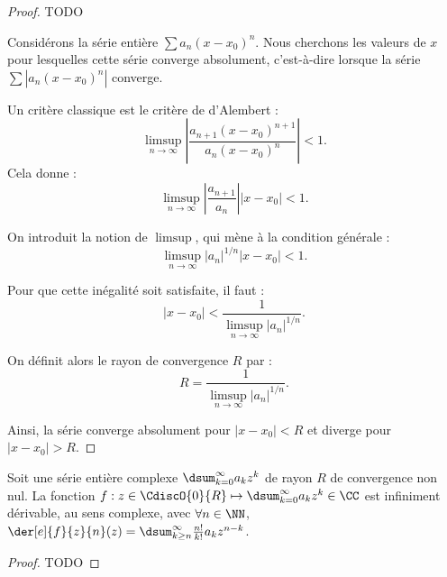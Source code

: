 \begin{proof}
	TODO
	
	
	
	Considérons la série entière \( \sum a_n (x - x_0)^n \). Nous cherchons les valeurs de \( x \) pour lesquelles cette série converge absolument, c'est-à-dire lorsque la série \( \sum |a_n (x - x_0)^n| \) converge.

Un critère classique est le critère de d'Alembert :
\begin{equation}
    \limsup_{n \to \infty} \left| \frac{a_{n+1} (x - x_0)^{n+1}}{a_n (x - x_0)^n} \right| < 1.
\end{equation}
Cela donne :
\begin{equation}
    \limsup_{n \to \infty} \left| \frac{a_{n+1}}{a_n} \right| |x - x_0| < 1.
\end{equation}

On introduit la notion de \( \limsup \), qui mène à la condition générale :
\begin{equation}
    \limsup_{n \to \infty} |a_n|^{1/n} |x - x_0| < 1.
\end{equation}

Pour que cette inégalité soit satisfaite, il faut :
\begin{equation}
    |x - x_0| < \frac{1}{\limsup_{n \to \infty} |a_n|^{1/n}}.
\end{equation}

On définit alors le rayon de convergence \( R \) par :
\begin{equation}
    R = \frac{1}{\limsup_{n \to \infty} |a_n|^{1/n}}.
\end{equation}

Ainsi, la série converge absolument pour \( |x - x_0| < R \) et diverge pour \( |x - x_0| > R \).
\end{proof}




\begin{preli} \label{XXX}
    Soit une série entière complexe $\dsum_{k=0}^{\infty} a_k z^k$ de rayon $R$ de convergence non nul.
    La fonction $f: z \in \CdiscO{0}{R} \mapsto \dsum_{k=0}^{\infty} a_k z^k \in \CC$ est infiniment dérivable, au sens complexe, avec $\forall n \in \NN$, $\der[e]{f}{z}{n}(z) = \dsum_{k \geq n}^{\infty} \frac{n!}{k!} a_k z^{n - k}$.
\end{preli}


\begin{proof}
	TODO
\end{proof}


